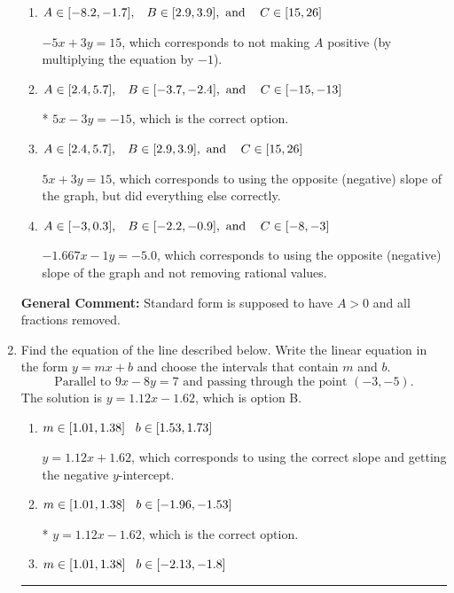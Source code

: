 \documentclass{extbook}[14pt]
\newcommand{\litem}[1]{\item #1

\rule{\textwidth}{0.4pt}}
\begin{document}
\begin{enumerate}
{\begin{enumerate}[label=\Alph*.]
 $-1.667x + 1y = 5.0$, which corresponds to not removing rational values for Standard Form.
\item \( A \in [-8.2, -1.7], \hspace{3mm} B \in [2.9, 3.9], \text{ and } \hspace{3mm} C \in [15, 26] \)

 $-5x + 3y = 15$, which corresponds to not making $A$ positive (by multiplying the equation by $-1$).
\item \( A \in [2.4, 5.7], \hspace{3mm} B \in [-3.7, -2.4], \text{ and } \hspace{3mm} C \in [-15, -13] \)

* $5x - 3y = -15$, which is the correct option.
\item \( A \in [2.4, 5.7], \hspace{3mm} B \in [2.9, 3.9], \text{ and } \hspace{3mm} C \in [15, 26] \)

 $5x + 3y = 15$, which corresponds to using the opposite (negative) slope of the graph, but did everything else correctly.
\item \( A \in [-3, 0.3], \hspace{3mm} B \in [-2.2, -0.9], \text{ and } \hspace{3mm} C \in [-8, -3] \)

 $-1.667x - 1y = -5.0$, which corresponds to using the opposite (negative) slope of the graph and not removing rational values.
\end{enumerate}

\textbf{General Comment:} Standard form is supposed to have $A > 0$ and all fractions removed.
}
\litem{
Find the equation of the line described below. Write the linear equation in the form $ y=mx+b $ and choose the intervals that contain $m$ and $b$.
\[ \text{Parallel to } 9 x - 8 y = 7 \text{ and passing through the point } (-3, -5). \]The solution is \( y = 1.12x - 1.62 \), which is option B.\begin{enumerate}[label=\Alph*.]
\item \( m \in [1.01, 1.38] \hspace*{3mm} b \in [1.53, 1.73] \)

 $y = 1.12x + 1.62$, which corresponds to using the correct slope and getting the negative $y$-intercept.
\item \( m \in [1.01, 1.38] \hspace*{3mm} b \in [-1.96, -1.53] \)

* $y = 1.12x - 1.62$, which is the correct option.
\item \( m \in [1.01, 1.38] \hspace*{3mm} b \in [-2.13, -1.8] \)


\end{enumerate}}
\end{enumerate}
\end{document}
